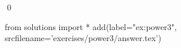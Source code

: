 
\begin{ex} 
  \label{ex:power3}
  
  \qed
\end{ex} 
\begin{python0}
from solutions import *
add(label="ex:power3",
    srcfilename='exercises/power3/answer.tex') 
\end{python0}
